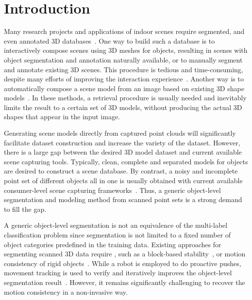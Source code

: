 \section{Introduction}
\label{sec:intro}
Many research projects and applications of indoor scenes require segmented, and even annotated 3D databases~\cite{SearchClassify,SceneFromExample,Fisher:2012:ESO:2366145.2366154,Chen:2014:ASM:2661229.2661239,Fisher:ActivityCentricSceneSynthesis}.
%
One way to build such a database is to interactively compose scenes using 3D meshes for objects, resulting in scenes with object segmentation and annotation naturally available, or to manually segment and annotate existing 3D scenes. This procedure is tedious and time-consuming, despite many efforts of improving the interaction experience~\cite{Merrell:2011:IFL:2010324.1964982,Xu:2013:SSC:2461912.2461968}. 
%
Another way is to automatically compose a scene model from an image based on existing 3D shape models~\cite{Liu2015Model,Chen:2014:ASM:2661229.2661239}.  
In these methods, a retrieval procedure is usually needed and inevitably limits the result to a certain set of 3D models, without producing the actual 3D shapes that appear in the input image.

Generating scene models directly from captured point clouds will significantly facilitate dataset construction and increase the variety of the dataset. 
However, there is a large gap between the desired 3D model dataset and current available scene capturing tools. Typically, clean, complete and separated models for objects are desired to construct a scene database. 
By contrast, a noisy and incomplete point set of different objects all in one is usually obtained with current available consumer-level scene capturing frameworks~\cite{KinectFusion,VXH,dai2016bundlefusion}. 
Thus, a generic object-level segmentation and modeling method from scanned point sets is a strong demand to fill the gap.

A generic object-level segmentation is not an equivalence of the multi-label classification problem since segmentation is not limited to a fixed number of object categories predefined in the training data. 
Existing approaches for segmenting scanned 3D data require , such as a block-based stability~\cite{3DReasoningfromBlockstoStability}, or motion consistency of rigid objects~\cite{Xu:2015:ACS:2816795.2818075}. 
While a robot is employed to do proactive pushes, movement tracking is used to verify and iteratively improves the object-level segmentation result~\cite{Xu:2015:ACS:2816795.2818075}.
However, it remains significantly challenging to recover the motion consistency in a non-invasive way. 


